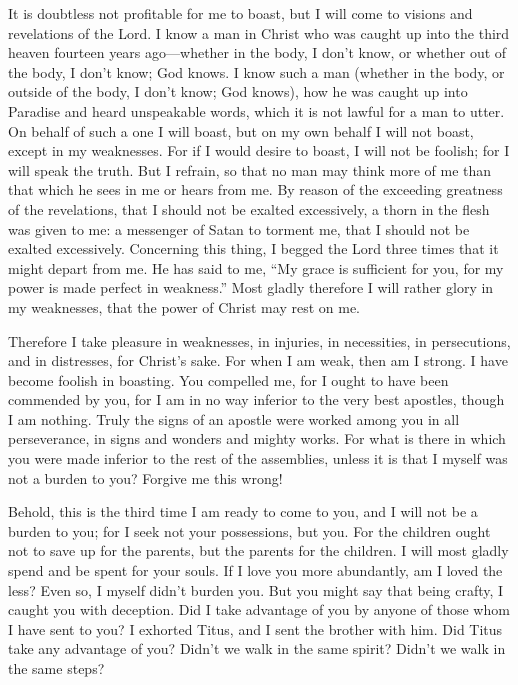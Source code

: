  It is doubtless not profitable for me to boast, but I will
come to visions and revelations of the Lord.  I know a man
in Christ who was caught up into the third heaven fourteen years
ago---whether in the body, I don't know, or whether out of the body, I
don't know; God knows.  I know such a man (whether in the
body, or outside of the body, I don't know; God knows),  how
he was caught up into Paradise and heard unspeakable words, which it is
not lawful for a man to utter.  On behalf of such a one I
will boast, but on my own behalf I will not boast, except in my
weaknesses.  For if I would desire to boast, I will not be
foolish; for I will speak the truth. But I refrain, so that no man may
think more of me than that which he sees in me or hears from me.
 By reason of the exceeding greatness of the revelations,
that I should not be exalted excessively, a thorn in the flesh was given
to me: a messenger of Satan to torment me, that I should not be exalted
excessively.  Concerning this thing, I begged the Lord three
times that it might depart from me.  He has said to me, ``My
grace is sufficient for you, for my power is made perfect in weakness.''
Most gladly therefore I will rather glory in my weaknesses, that the
power of Christ may rest on me.

 Therefore I take pleasure in weaknesses, in injuries, in
necessities, in persecutions, and in distresses, for Christ's sake. For
when I am weak, then am I strong.  I have become foolish in
boasting. You compelled me, for I ought to have been commended by you,
for I am in no way inferior to the very best apostles, though I am
nothing.  Truly the signs of an apostle were worked among
you in all perseverance, in signs and wonders and mighty works.
 For what is there in which you were made inferior to the
rest of the assemblies, unless it is that I myself was not a burden to
you? Forgive me this wrong!

 Behold, this is the third time I am ready to come to you,
and I will not be a burden to you; for I seek not your possessions, but
you. For the children ought not to save up for the parents, but the
parents for the children.  I will most gladly spend and be
spent for your souls. If I love you more abundantly, am I loved the
less?  Even so, I myself didn't burden you. But you might
say that being crafty, I caught you with deception.  Did I
take advantage of you by anyone of those whom I have sent to you?
 I exhorted Titus, and I sent the brother with him. Did
Titus take any advantage of you? Didn't we walk in the same spirit?
Didn't we walk in the same steps?

